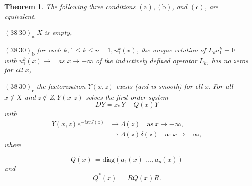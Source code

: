 \documentclass{surv-l}
\theoremstyle{plain}
\newtheorem{theorem}{Theorem}[section]
\theoremstyle{definition}
\numberwithin{equation}{chapter}
\begin{document}
\begin{theorem}
The following three conditions $\mathrm{(a),(b)}$, and $\mathrm{(c)}$, are equivalent.

$\mathrm{(38.30)_{a}}$ X is empty,

$\mathrm{(38.30)_{b}}$ for each $k, 1\leq k\leq n-1, u_{1}^{k}(x)$, the unique solution of $L_{k}u_{1}^{k}=0$ with $u_{1}^{k}(x)\rightarrow 1$ as $ x\rightarrow-\infty$ of the inductively defined operator $L_{k}$, has no zeros for all $x$,

$\mathrm{(38.30)_{\mathrm{c}}}$ the factorization $Y(x, z)$ exists (and is smooth) for all x. For all $x\not\in X$ and $z\not\in Z, Y(x, z)$ solves the first order system
\setcounter{equation}{30}
\begin{equation}\label{eq38.31}
DY=z\pi Y+Q(x)Y
\end{equation}
with
\begin{align}\label{eq38.32}
Y(x,z)e^{-ixzJ(z)}& \rightarrow\Lambda(z)\quad \mathrm{as}\ x\rightarrow-\infty,\\\nonumber
& \rightarrow\Lambda(z)\delta(z)\quad \mathrm{as}\ x\rightarrow + \infty,
\end{align}
where\end{theorem}
\begin{equation}
Q(x)\ =\mathrm{diag}(a_{1}(x), \ldots,a_{n}(x))
\end{equation}
\emph{and}
\begin{equation}
Q^{*}(x)\ =RQ(x)R.
\end{equation}
\end{document}
